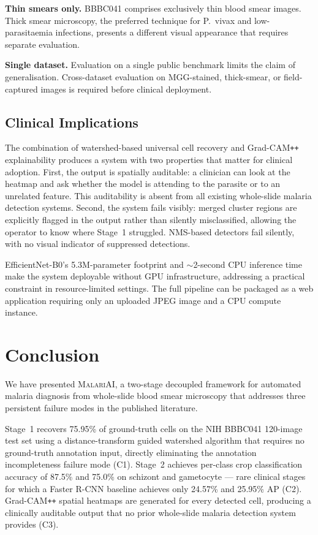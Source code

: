\documentclass[10pt,twocolumn]{article}
\newcommand{\malariai}{\textsc{MalariAI}}
\begin{document}
\textbf{Thin smears only.} BBBC041 comprises exclusively thin blood smear
images. Thick smear microscopy, the preferred technique for P.\ vivax and
low-parasitaemia infections, presents a different visual appearance that
requires separate evaluation.

\textbf{Single dataset.} Evaluation on a single public benchmark limits
the claim of generalisation. Cross-dataset evaluation on MGG-stained,
thick-smear, or field-captured images is required before clinical deployment.

\subsection{Clinical Implications}
\label{ssec:clinical}

The combination of watershed-based universal cell recovery and
Grad-CAM\texttt{++} explainability produces a system with two properties
that matter for clinical adoption. First, the output is spatially auditable:
a clinician can look at the heatmap and ask whether the model is attending
to the parasite or to an unrelated feature. This auditability is absent
from all existing whole-slide malaria detection systems. Second, the system
fails visibly: merged cluster regions are explicitly flagged in the output
rather than silently misclassified, allowing the operator to know where
Stage~1 struggled. NMS-based detectors fail silently, with no visual
indicator of suppressed detections.

EfficientNet-B0's 5.3M-parameter footprint and $\sim$2-second CPU inference
time make the system deployable without GPU infrastructure, addressing
a practical constraint in resource-limited settings. The full pipeline can
be packaged as a web application requiring only an uploaded JPEG image
and a CPU compute instance.

\section{Conclusion}
\label{sec:conclusion}

We have presented \malariai{}, a two-stage decoupled framework for
automated malaria diagnosis from whole-slide blood smear microscopy that
addresses three persistent failure modes in the published literature.

Stage~1 recovers 75.95\% of ground-truth cells on the NIH BBBC041
120-image test set using a distance-transform guided watershed algorithm
that requires no ground-truth annotation input, directly eliminating the
annotation incompleteness failure mode (C1). Stage~2 achieves per-class
crop classification accuracy of 87.5\% and 75.0\% on schizont and
gametocyte --- rare clinical stages for which a Faster R-CNN baseline
achieves only 24.57\% and 25.95\% AP (C2). Grad-CAM\texttt{++} spatial
heatmaps are generated for every detected cell, producing a clinically
auditable output that no prior whole-slide malaria detection system provides (C3).
\end{document}
